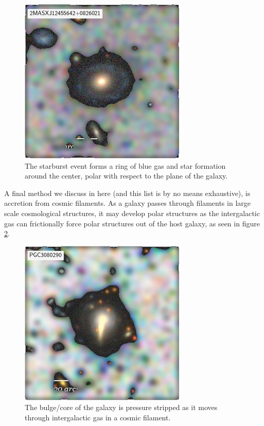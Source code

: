\documentclass[letter]{aa}
\begin{document}
\begin{figure}
    \centering
    \includegraphics[scale = 0.7]{Images/2MASXJ12455642+0826021.jpg}
    \caption{The starburst event forms a ring of blue gas and star formation around the center, polar with respect to the plane of the galaxy.}
    \label{fig:starburst}
\end{figure}

A final method we discuss in  here (and this list is by no means exhaustive), is accretion from cosmic filaments. As a galaxy passes through filaments in large scale cosmological structures, it may develop polar structures as the intergalactic gas can frictionally force polar structures out of the host galaxy, as seen in figure \ref{fig:cosmic}.

\begin{figure}
    \centering
    \includegraphics[scale = 0.7]{Images/PGC3080290.jpg}
    \caption{The bulge/core of the galaxy is pressure stripped as it moves through intergalactic gas in a cosmic filament.}
    \label{fig:cosmic}
\end{figure}
\end{document}
